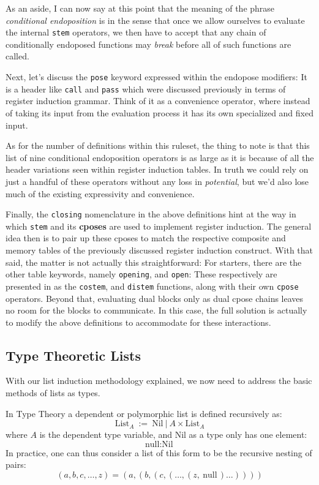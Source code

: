 \documentclass[twoside]{article}
\newcommand{\strong}[1]{{\bfseries #1}}
\begin{document}
As an aside, I can now say at this point that the meaning of the phrase \emph{conditional endoposition} is in the sense that
once we allow ourselves to evaluate the internal \texttt{stem} operators, we then have to accept that any chain of conditionally
endoposed functions may \emph{break} before all of such functions are called.

Next, let's discuss the \texttt{pose} keyword expressed within the endopose modifiers: It is a header like \texttt{call} and
\texttt{pass} which were discussed previously in terms of register induction grammar. Think of it as a convenience operator,
where instead of taking its input from the evaluation process it has its own specialized and fixed input.

As for the number of definitions within this ruleset, the thing to note is that this list of nine conditional endoposition
operators is as large as it is because of all the header variations seen within register induction tables. In truth we could
rely on just a handful of these operators without any loss in \emph{potential}, but we'd also lose much of the existing
expressivity and convenience.

Finally, the \texttt{closing} nomenclature in the above definitions hint at the way in which \texttt{stem} and its \strong{cposes}
are used to implement register induction. The general idea then is to pair up these cposes to match the respective composite
and memory tables of the previously discussed register induction construct. With that said, the matter is not actually this
straightforward: For starters, there are the other table keywords, namely \texttt{opening}, and \texttt{open}: These respectively
are presented in \cite{nikfi} as the \texttt{costem}, and \texttt{distem} functions, along with their own \texttt{cpose}
operators.  Beyond that, evaluating dual blocks only as dual cpose chains leaves no room for the blocks to communicate.
In this case, the full solution is actually to modify the above definitions to accommodate for these interactions.

\subsection*{Type Theoretic Lists}

With our list induction methodology explained, we now need to address the basic methods of lists as types.

In Type Theory a dependent or polymorphic list is defined recursively as:
$$ \mbox{List}_A\ :=\ \mbox{Nil}\ |\ A \times \mbox{List}_A $$
where $ A $ is the dependent type variable, and Nil as a type only has one element:
$$ \mbox{null} : \mbox{Nil} $$
In practice, one can thus consider a list of this form to be the recursive nesting of pairs:
$$ (a, b, c, \ldots, z) = (a, (b, (c, (\ldots, (z,\ \mbox{null}\,) \ldots )))) $$
\end{document}
